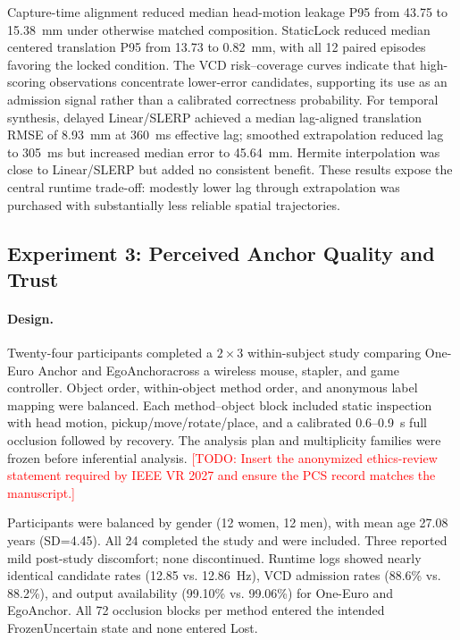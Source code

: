 \documentclass[review]{vgtc}
\newcommand{\system}{EgoAnchor}
\newcommand{\todo}[1]{\textcolor{red}{[TODO: #1]}}
\begin{document}
Capture-time alignment reduced median head-motion leakage P95 from 43.75 to 15.38~mm under otherwise matched composition. StaticLock reduced median centered translation P95 from 13.73 to 0.82~mm, with all 12 paired episodes favoring the locked condition. The VCD risk--coverage curves indicate that high-scoring observations concentrate lower-error candidates, supporting its use as an admission signal rather than a calibrated correctness probability. For temporal synthesis, delayed Linear/SLERP achieved a median lag-aligned translation RMSE of 8.93~mm at 360~ms effective lag; smoothed extrapolation reduced lag to 305~ms but increased median error to 45.64~mm. Hermite interpolation was close to Linear/SLERP but added no consistent benefit. These results expose the central runtime trade-off: modestly lower lag through extrapolation was purchased with substantially less reliable spatial trajectories.

\subsection{Experiment 3: Perceived Anchor Quality and Trust}
\paragraph{Design.}
Twenty-four participants completed a $2\times3$ within-subject study comparing One-Euro Anchor and \system across a wireless mouse, stapler, and game controller. Object order, within-object method order, and anonymous label mapping were balanced. Each method--object block included static inspection with head motion, pickup/move/rotate/place, and a calibrated 0.6--0.9~s full occlusion followed by recovery. The analysis plan and multiplicity families were frozen before inferential analysis. \todo{Insert the anonymized ethics-review statement required by IEEE VR 2027 and ensure the PCS record matches the manuscript.}

Participants were balanced by gender (12 women, 12 men), with mean age 27.08 years (SD=4.45). All 24 completed the study and were included. Three reported mild post-study discomfort; none discontinued. Runtime logs showed nearly identical candidate rates (12.85 vs. 12.86~Hz), VCD admission rates (88.6\% vs. 88.2\%), and output availability (99.10\% vs. 99.06\%) for One-Euro and \system. All 72 occlusion blocks per method entered the intended FrozenUncertain state and none entered Lost.
\end{document}
